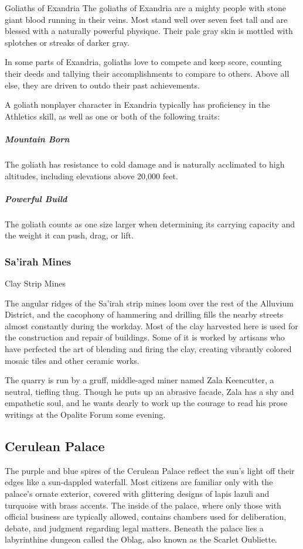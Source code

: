 \documentclass[10pt,a4paper,twoside,twocolumn,openany,nodeprecatedcode]{dndbook}
\begin{document}
\begin{DndSidebar}[float=!b]{Goliaths of Exandria}
The goliaths of Exandria are a mighty people with stone giant blood running in their veins. Most stand well over seven feet tall and are blessed with a naturally powerful physique. Their pale gray skin is mottled with splotches or streaks of darker gray.

In some parts of Exandria, goliaths love to compete and keep score, counting their deeds and tallying their accomplishments to compare to others. Above all else, they are driven to outdo their past achievements.

A goliath nonplayer character in Exandria typically has proficiency in the Athletics skill, as well as one or both of the following traits:

\subparagraph{Mountain Born}
The goliath has resistance to cold damage and is naturally acclimated to high altitudes, including elevations above 20,000 feet.

\subparagraph{Powerful Build}
The goliath counts as one size larger when determining its carrying capacity and the weight it can push, drag, or lift.

\end{DndSidebar}

\subsubsection{Sa'irah Mines}
Clay Strip Mines

The angular ridges of the Sa'irah strip mines loom over the rest of the Alluvium District, and the cacophony of hammering and drilling fills the nearby streets almost constantly during the workday. Most of the clay harvested here is used for the construction and repair of buildings. Some of it is worked by artisans who have perfected the art of blending and firing the clay, creating vibrantly colored mosaic tiles and other ceramic works.

The quarry is run by a gruff, middle-aged miner named Zala Keencutter, a neutral, tiefling thug. Though he puts up an abrasive facade, Zala has a shy and empathetic soul, and he wants dearly to work up the courage to read his prose writings at the Opalite Forum some evening.

\subsection{Cerulean Palace}
The purple and blue spires of the Cerulean Palace reflect the sun's light off their edges like a sun-dappled waterfall. Most citizens are familiar only with the palace's ornate exterior, covered with glittering designs of lapis lazuli and turquoise with brass accents. The inside of the palace, where only those with official business are typically allowed, contains chambers used for deliberation, debate, and judgment regarding legal matters. Beneath the palace lies a labyrinthine dungeon called the Oblag, also known as the Scarlet Oubliette.
\end{document}
